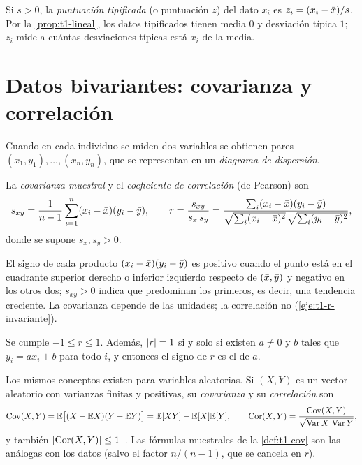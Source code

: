 \begin{definicion}[Tipificación]\label{def:t1-z}
Si $s>0$, la \emph{puntuación tipificada} (o puntuación $z$) del dato $x_i$ es $z_i=(x_i-\bar{x})/s$. Por la \cref{prop:t1-lineal}, los datos tipificados tienen media $0$ y desviación típica $1$; $z_i$ mide a cuántas desviaciones típicas está $x_i$ de la media.
\end{definicion}

\section{Datos bivariantes: covarianza y correlación}

Cuando en cada individuo se miden dos variables se obtienen pares $(x_1,y_1),\dots,(x_n,y_n)$, que se representan en un \emph{diagrama de dispersión}.

\begin{definicion}\label{def:t1-cov}
La \emph{covarianza muestral} y el \emph{coeficiente de correlación} (de Pearson) son
\[
s_{xy}=\frac{1}{n-1}\sum_{i=1}^{n}(x_i-\bar{x})(y_i-\bar{y}),
\qquad
r=\frac{s_{xy}}{s_x\,s_y}=\frac{\sum_i(x_i-\bar{x})(y_i-\bar{y})}{\sqrt{\sum_i(x_i-\bar{x})^{2}}\,\sqrt{\sum_i(y_i-\bar{y})^{2}}},
\]
donde se supone $s_x,s_y>0$.
\end{definicion}

El signo de cada producto $(x_i-\bar{x})(y_i-\bar{y})$ es positivo cuando el punto está en el cuadrante superior derecho o inferior izquierdo respecto de $(\bar{x},\bar{y})$ y negativo en los otros dos; $s_{xy}>0$ indica que predominan los primeros, es decir, una tendencia creciente. La covarianza depende de las unidades; la correlación no (\cref{eje:t1-r-invariante}).

\begin{teorema}\label{teo:t1-r}
Se cumple $-1\le r\le 1$. Además, $\lvert r\rvert=1$ si y solo si existen $a\neq 0$ y $b$ tales que $y_i=ax_i+b$ para todo $i$, y entonces el signo de $r$ es el de $a$.
\end{teorema}

\addtocounter{definicion}{1}%

Los mismos conceptos existen para variables aleatorias. Si $(X,Y)$ es un vector aleatorio con varianzas finitas y positivas, su \emph{covarianza} y su \emph{correlación} son
\[
\operatorname{Cov}(X,Y)=\mathbb{E}\bigl[(X-\mathbb{E} X)(Y-\mathbb{E} Y)\bigr]=\mathbb{E}[XY]-\mathbb{E}[X]\mathbb{E}[Y],
\qquad
\operatorname{Cor}(X,Y)=\frac{\operatorname{Cov}(X,Y)}{\sqrt{\operatorname{Var} X\,\operatorname{Var} Y}},
\]
y también $\lvert\operatorname{Cor}(X,Y)\rvert\le1$~\cite[§7.3]{bh}. Las fórmulas muestrales de la \cref{def:t1-cov} son las análogas con los datos (salvo el factor $n/(n-1)$, que se cancela en $r$).

\addtocounter{definicion}{1}%

\addtocounter{definicion}{1}%

